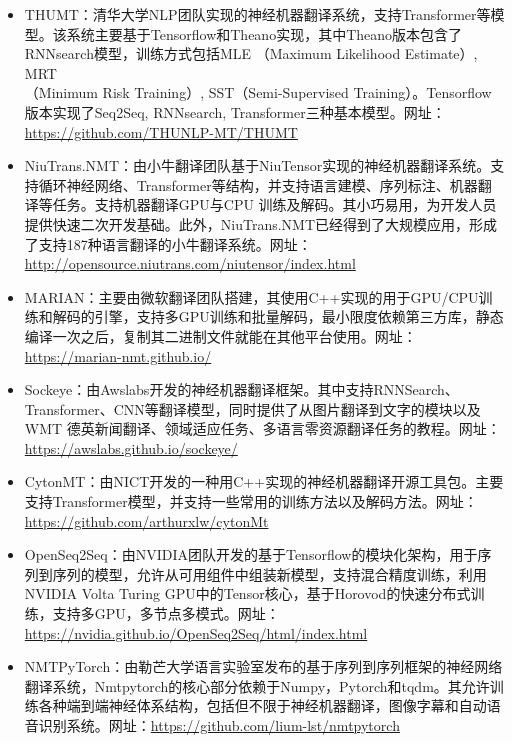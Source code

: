 \begin{itemize}
\vspace{0.5em}
\item THUMT：清华大学NLP团队实现的神经机器翻译系统，支持Transformer等模型\cite{ZhangTHUMT}。该系统主要基于Tensorflow和Theano实现，其中Theano版本包含了RNNsearch模型，训练方式包括MLE （Maximum Likelihood Estimate）, MRT\\（Minimum Risk Training）, SST（Semi-Supervised Training）。Tensorflow 版本实现了Seq2Seq, RNNsearch, Transformer三种基本模型。网址：\url{https://github.com/THUNLP-MT/THUMT}
\vspace{0.5em}
\item NiuTrans.NMT：由小牛翻译团队基于NiuTensor实现的神经机器翻译系统。支持循环神经网络、Transformer等结构，并支持语言建模、序列标注、机器翻译等任务。支持机器翻译GPU与CPU 训练及解码。其小巧易用，为开发人员提供快速二次开发基础。此外，NiuTrans.NMT已经得到了大规模应用，形成了支持187种语言翻译的小牛翻译系统。网址：\url{http://opensource.niutrans.com/niutensor/index.html}
\vspace{0.5em}
\item MARIAN：主要由微软翻译团队搭建\cite{JunczysMarian}，其使用C++实现的用于GPU/CPU训练和解码的引擎，支持多GPU训练和批量解码，最小限度依赖第三方库，静态编译一次之后，复制其二进制文件就能在其他平台使用。网址：\url{https://marian-nmt.github.io/}
\vspace{0.5em}
\item Sockeye：由Awslabs开发的神经机器翻译框架\cite{hieber2017sockeye}。其中支持RNNSearch、Transformer、CNN等翻译模型，同时提供了从图片翻译到文字的模块以及WMT 德英新闻翻译、领域适应任务、多语言零资源翻译任务的教程。网址：\url{https://awslabs.github.io/sockeye/}
\vspace{0.5em}
\item CytonMT：由NICT开发的一种用C++实现的神经机器翻译开源工具包\cite{WangCytonMT}。主要支持Transformer模型，并支持一些常用的训练方法以及解码方法。网址：\url{https://github.com/arthurxlw/cytonMt}
\vspace{0.5em}
\item OpenSeq2Seq：由NVIDIA团队开发的\cite{DBLP:journals/corr/abs-1805-10387}基于Tensorflow的模块化架构，用于序列到序列的模型，允许从可用组件中组装新模型，支持混合精度训练，利用NVIDIA Volta Turing GPU中的Tensor核心，基于Horovod的快速分布式训练，支持多GPU，多节点多模式。网址：\url{https://nvidia.github.io/OpenSeq2Seq/html/index.html}
\vspace{0.5em}
\item NMTPyTorch：由勒芒大学语言实验室发布的基于序列到序列框架的神经网络翻译系统\cite{nmtpy2017}，Nmtpytorch的核心部分依赖于Numpy，Pytorch和tqdm。其允许训练各种端到端神经体系结构，包括但不限于神经机器翻译，图像字幕和自动语音识别系统。网址：\url{https://github.com/lium-lst/nmtpytorch}
\vspace{0.5em}
\end{itemize}


